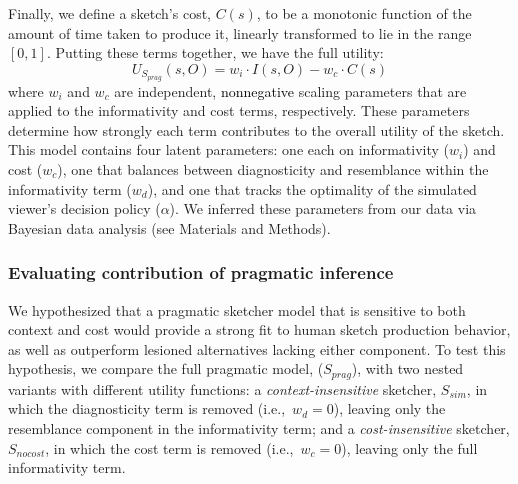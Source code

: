 \documentclass{svjour3}
\newcommand{\revised}[1]{\textcolor{Black}{#1}}
\begin{document}
Finally, we define a sketch's cost, $C(s)$, to be a monotonic function of the amount of time taken to produce it, linearly transformed to lie in the range $[0,1]$. 
Putting these terms together, we have the full utility:
\begin{equation} \label{sketcher_utility}
U_{S_{prag}}(s,O) = w_i \cdot I(s,O) - w_c \cdot  C(s)
\end{equation}
where $w_i$ and $w_c$ are independent, \revised{nonnegative} scaling parameters that are applied to the informativity and cost terms, respectively.
These parameters determine how strongly each term contributes to the overall utility of the sketch. 
This model contains four latent parameters: one each on informativity ($w_{i}$) and cost ($w_{c}$), one that balances between diagnosticity and resemblance within the informativity term ($w_{d}$), and one that tracks the optimality of the simulated viewer's decision policy ($\alpha$). 
We inferred these parameters from our data via Bayesian data analysis (see Materials and Methods).


\subsubsection*{Evaluating contribution of pragmatic inference}

We hypothesized that a pragmatic sketcher model that is sensitive to both context and cost would provide a strong fit to human sketch production behavior, as well as outperform lesioned alternatives lacking either component.
To test this hypothesis, we compare the full pragmatic model, ($S_{prag}$), with two nested variants with different utility functions:
a \textit{context-insensitive} sketcher, $S_{sim}$, in which the diagnosticity term is removed (i.e.,~$w_{d}{=}0$), leaving only the resemblance component in the informativity term; and  
a \textit{cost-insensitive} sketcher, $S_{nocost}$, in which the cost term is removed (i.e.,~$w_c=0$), leaving only the full informativity term. 
\end{document}
